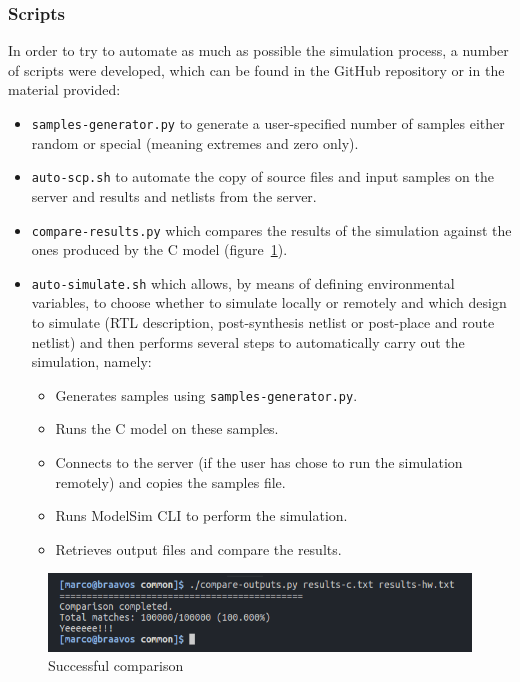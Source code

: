 \documentclass[a4paper]{article}
\begin{document}
\subsubsection{Scripts}
In order to try to automate as much as possible the simulation process, a number of scripts were developed, which can be found in the GitHub repository or in the material provided:
\begin{itemize}
    \item \texttt{samples-generator.py} to generate a user-specified number of samples either random or special (meaning extremes and zero only).
    \item \texttt{auto-scp.sh} to automate the copy of source files and input samples on the server and results and netlists from the server.
    \item \texttt{compare-results.py} which compares the results of the simulation against the ones produced by the C model (figure~\ref{fig:yeee}).
    \item \texttt{auto-simulate.sh} which allows, by means of defining environmental variables, to choose whether to simulate locally or remotely and which design to simulate (RTL description, post-synthesis netlist or post-place and route netlist) and then performs several steps to automatically carry out the simulation, namely:
    \begin{itemize}
        \item Generates samples using \texttt{samples-generator.py}.
        \item Runs the C model on these samples.
        \item Connects to the server (if the user has chose to run the simulation remotely) and copies the samples file.
        \item Runs ModelSim CLI to perform the simulation.
        \item Retrieves output files and compare the results.
    \end{itemize}
\end{itemize}

\begin{figure}[hbtp]
    \centering
    \includegraphics[width=.8\linewidth]{media/2018-12-20-143134_627x116_scrot.png}
    \caption{Successful comparison}
    \label{fig:yeee}
\end{figure}
\end{document}
